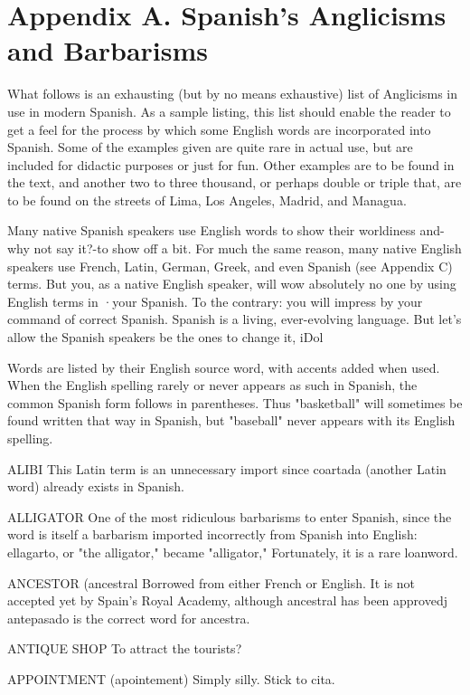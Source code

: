\chapter{Appendix A. Spanish's Anglicisms and Barbarisms}
What follows is an exhausting (but by no means exhaustive)
list of Anglicisms in use in modern Spanish. As a sample listing, this
list should enable the reader to get a feel for the process by which
some English words are incorporated into Spanish. Some of the examples given are quite rare in actual use, but are included for didactic
purposes or just for fun. Other examples are to be found in the text,
and another two to three thousand, or perhaps double or triple that, are
to be found on the streets of Lima, Los Angeles, Madrid, and Managua.

Many native Spanish speakers use English words to show their
worldiness and-why not say it?-to show off a bit. For much the
same reason, many native English speakers use French, Latin, German,
Greek, and even Spanish (see Appendix C) terms. But you, as a native
English speaker, will wow absolutely no one by using English terms in
·your Spanish. To the contrary: you will impress by your command of
correct Spanish. Spanish is a living, ever-evolving language. But let's
allow the Spanish speakers be the ones to change it, iDol

Words are listed by their English source word, with accents
added when used. When the English spelling rarely or never appears
as such in Spanish, the common Spanish form follows in parentheses.
Thus "basketball" will sometimes be found written that way in Spanish, but "baseball" never appears with its English spelling.

\bsk

ALIBI This Latin term is an unnecessary import since coartada (another Latin word) already exists in Spanish.

ALLIGATOR One of the most ridiculous barbarisms to enter
Spanish, since the word is itself a barbarism imported incorrectly from
Spanish into English: ellagarto, or "the alligator," became "alligator,"
Fortunately, it is a rare loanword.

ANCESTOR (ancestral Borrowed from either French or English.
It is not accepted yet by Spain's Royal Academy, although ancestral
has been approvedj antepasado is the correct word for ancestra.

ANTIQUE SHOP To attract the tourists?

APPOINTMENT (apointement) Simply silly. Stick to cita.

